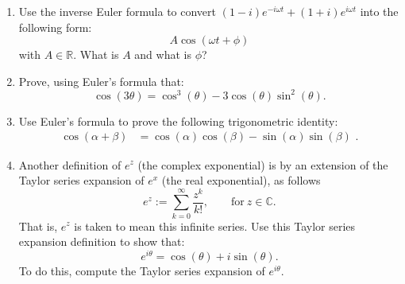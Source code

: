 \begin{enumerate}
  \item Use the inverse Euler formula to convert $(1-i) e^{-i \omega t} + (1+i) e^{i\omega t}$
        into the following form:
        \begin{equation*}
          A \cos(\omega t  + \phi)
        \end{equation*}
        with $A\in \mathbb{R}$. What is $A$ and what is $\phi$?

  \item Prove, using Euler's formula that:
        \begin{equation*}
          \cos(3\theta) = \cos^3(\theta)-3\cos(\theta)\sin^2(\theta).
        \end{equation*}

  \item Use Euler's formula to prove the following trigonometric identity:
        \begin{align*}
          \cos(\alpha + \beta) & =\cos(\alpha)\cos(\beta) - \sin(\alpha)\sin(\beta)\,\,.
        \end{align*}

  \item Another definition of $e^{z}$ (the complex exponential) is by an extension of the Taylor series
        expansion of $e^{x}$ (the real exponential), as follows
        \[e^{z} := \sum_{k=0}^{\infty}\frac{z^{k}}{k!}, \quad\quad \text{for}\ z\in\mathbb{C}.\]
        That is, $e^{z}$ is taken to mean this infinite series. Use this Taylor series expansion definition to show that:
        \begin{equation}
          e^{i\theta} = \cos(\theta) + i\sin(\theta).
          \label{ch03:euler_formula}
        \end{equation}
        To do this, compute the Taylor series expansion of $e^{i\theta}$.

\end{enumerate}